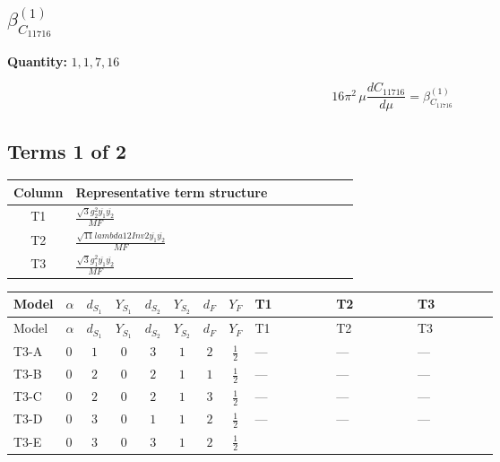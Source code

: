 \documentclass[8pt]{article}
\begin{document}
\begin{landscape}
\section*{$\beta_{C_{11716}}^{(1)}$}
\noindent\textbf{Quantity: }$\mathrm{1,1,7,16}$\par\smallskip
\[16\pi^2\,\mu\frac{d C_{11716}}{d\mu}=\beta_{C_{11716}}^{(1)}\]
\subsection*{Terms 1 of 2}
\begin{center}
\begin{tabular}{@{}c >{\raggedright\arraybackslash}p{0.82\linewidth}@{}}
\toprule
Column & Representative term structure \\
\midrule
T1 & \(\displaystyle \frac{\sqrt{3} g_{2}^{2} \overline{y_{1}} \overline{y_{2}}}{MF}\) \\
\midrule
T2 & \(\displaystyle \frac{\sqrt{11} lambda12Inv2 \overline{y_{1}} \overline{y_{2}}}{MF}\) \\
\midrule
T3 & \(\displaystyle \frac{\sqrt{3} g_{1}^{2} \overline{y_{1}} \overline{y_{2}}}{MF}\) \\
\midrule
\bottomrule
\end{tabular}
\end{center}
\smallskip
\tiny
\begin{longtable}{@{}llcccccc >{\raggedright\arraybackslash}p{0.21\linewidth} >{\raggedright\arraybackslash}p{0.21\linewidth} >{\raggedright\arraybackslash}p{0.21\linewidth}@{}}
\toprule
Model & $\alpha$ & $d_{S_1}$ & $Y_{S_1}$ & $d_{S_2}$ & $Y_{S_2}$ & $d_F$ & $Y_F$ & T1 & T2 & T3 \\
\midrule
\endfirsthead
\toprule
Model & $\alpha$ & $d_{S_1}$ & $Y_{S_1}$ & $d_{S_2}$ & $Y_{S_2}$ & $d_F$ & $Y_F$ & T1 & T2 & T3 \\
\midrule
\endhead
T3-A & $0$ & $1$ & $0$ & $3$ & $1$ & $2$ & $\frac{1}{2}$ & --- & --- & --- \\
\midrule
T3-B & $0$ & $2$ & $0$ & $2$ & $1$ & $1$ & $\frac{1}{2}$ & --- & --- & --- \\
\midrule
T3-C & $0$ & $2$ & $0$ & $2$ & $1$ & $3$ & $\frac{1}{2}$ & --- & --- & --- \\
\midrule
T3-D & $0$ & $3$ & $0$ & $1$ & $1$ & $2$ & $\frac{1}{2}$ & --- & --- & --- \\
\midrule
T3-E & $0$ & $3$ & $0$ & $3$ & $1$ & $2$ & $\frac{1}{2}$ & \scriptsize\adjustbox{max width=\linewidth}{$\begin{gathered} - \frac{11 \sqrt{3} g_{2}^{2} \overline{y_{1}} \overline{y_{2}}}{8 MF}\end{gathered}$} & \scriptsize\adjustbox{max width=\linewidth}{$\begin{gathered} - \frac{3 \sqrt{11} lambda12Inv2 \overline{y_{1}} \overline{y_{2}}}{22 MF}\end{gathered}$} & \scriptsize\adjustbox{max width=\linewidth}{$\begin{gathered} - \frac{\sqrt{3} g_{1}^{2} \overline{y_{1}} \overline{y_{2}}}{8 MF}\end{gathered}$} \\

\end{longtable}
\end{landscape}
\end{document}
